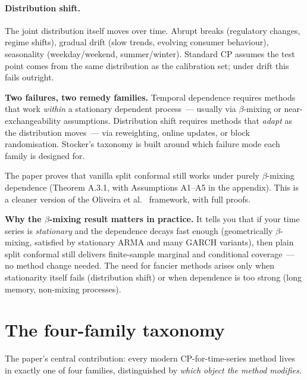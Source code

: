 \documentclass[letterpaper,11pt,leqno]{article}
\begin{document}
\paragraph{Distribution shift.} The joint distribution itself moves over time. Abrupt breaks (regulatory changes, regime shifts), gradual drift (slow trends, evolving consumer behaviour), seasonality (weekday/weekend, summer/winter). Standard CP assumes the test point comes from the same distribution as the calibration set; under drift this fails outright.

\begin{definitionexplain}
\textbf{Two failures, two remedy families.} Temporal dependence requires methods that work \emph{within} a stationary dependent process~--- usually via $\beta$-mixing or near-exchangeability assumptions. Distribution shift requires methods that \emph{adapt} as the distribution moves~--- via reweighting, online updates, or block randomisation. Stocker's taxonomy is built around which failure mode each family is designed for.
\end{definitionexplain}

The paper proves that vanilla split conformal still works under purely $\beta$-mixing dependence (Theorem A.3.1, with Assumptions A1--A5 in the appendix). This is a cleaner version of the Oliveira et al.\ \cite{oliveira2024split} framework, with full proofs.

\begin{theoremexplain}
\textbf{Why the $\beta$-mixing result matters in practice.} It tells you that if your time series is \emph{stationary} and the dependence decays fast enough (geometrically $\beta$-mixing, satisfied by stationary ARMA and many GARCH variants), then plain split conformal still delivers finite-sample marginal and conditional coverage~--- no method change needed. The need for fancier methods arises only when stationarity itself fails (distribution shift) or when dependence is too strong (long memory, non-mixing processes).
\end{theoremexplain}

\section{The four-family taxonomy}\label{s:taxonomy}

The paper's central contribution: every modern CP-for-time-series method lives in exactly one of four families, distinguished by \emph{which object the method modifies}.
\end{document}

